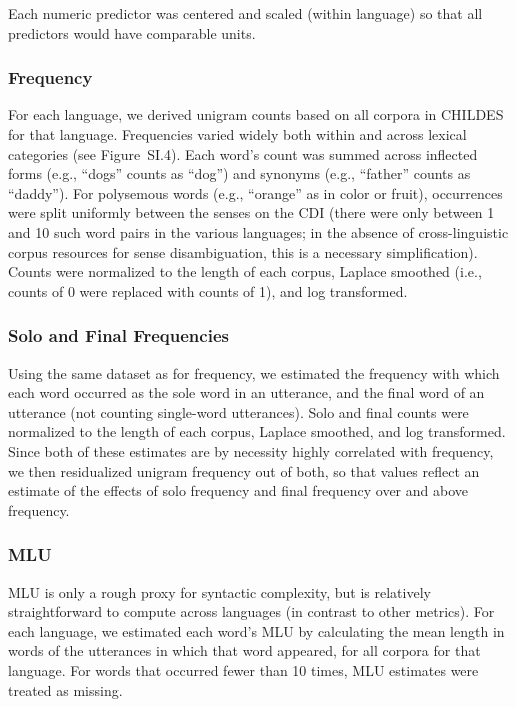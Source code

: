 \documentclass[manuscript]{stjour}
\begin{document}
Each numeric predictor was centered and scaled (within language) so that
all predictors would have comparable units.

\subsubsection{Frequency}

For each language, we derived unigram counts based on all corpora in
CHILDES for that language. Frequencies varied widely both within and
across lexical categories (see Figure~SI.4). Each
word's count was summed across inflected forms (e.g., ``dogs'' counts as
``dog'') and synonyms (e.g., ``father'' counts as ``daddy''). For
polysemous words (e.g., ``orange'' as in color or fruit), occurrences
were split uniformly between the senses on the CDI (there were only
between 1 and 10 such word pairs in the various languages; in the
absence of cross-linguistic corpus resources for sense disambiguation,
this is a necessary simplification). Counts were normalized to the
length of each corpus, Laplace smoothed (i.e., counts of 0 were replaced
with counts of 1), and log transformed.

\subsubsection{Solo and Final Frequencies}

Using the same dataset as for frequency, we estimated the frequency with
which each word occurred as the sole word in an utterance, and the final
word of an utterance (not counting single-word utterances). Solo and
final counts were normalized to the length of each corpus, Laplace
smoothed, and log transformed. Since both of these estimates are by
necessity highly correlated with frequency, we then residualized unigram
frequency out of both, so that values reflect an estimate of the effects
of solo frequency and final frequency over and above frequency.

\subsubsection{MLU}

MLU is only a rough proxy for syntactic complexity, but is relatively
straightforward to compute across languages (in contrast to other
metrics). For each language, we estimated each word's MLU by calculating
the mean length in words of the utterances in which that word appeared,
for all corpora for that language. For words that occurred fewer than 10
times, MLU estimates were treated as missing.
\end{document}

